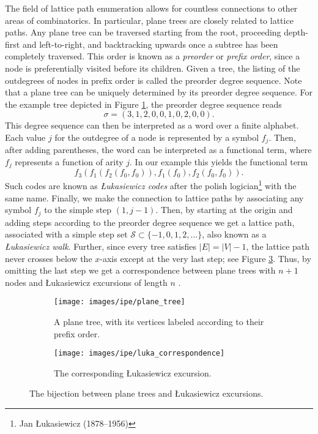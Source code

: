 The field of lattice path enumeration allows for countless connections to other areas of combinatorics. In particular, plane trees are closely related to lattice paths. 
Any plane tree can be traversed starting from the root, proceeding depth-first and left-to-right, and backtracking upwards once a subtree has been completely traversed. 
This order is known as a \textit{preorder} or \textit{prefix order}, since a node is preferentially visited before its children. 
Given a tree, the listing of the outdegrees of nodes in prefix order is called the preorder degree sequence. 
Note that a plane tree can be uniquely determined by its preorder degree sequence. 
For the example tree depicted in Figure \ref{fig:plane_tree}, the preorder degree sequence reads 
$$
  \sigma = (3,1,2,0,0,1,0,2,0,0).
$$
This degree sequence can then be interpreted as a word over a finite alphabet. 
Each value $j$ for the outdegree of a node is represented by a symbol $f_j$. 
Then, after adding parentheses, the word can be interpreted as a functional term, where $f_j$ represents a function of arity $j$. 
In our example this yields the functional term
$$
  f_3(f_1(f_2(f_0,f_0)),f_1(f_0),f_2(f_0,f_0)).
$$
Such codes are known as \textit{Łukasiewicz codes} after the polish logician\footnote{Jan Łukasiewicz (1878--1956)} with the same name.
Finally, we make the connection to lattice paths by associating any symbol $f_j$ to the simple step $(1, j - 1)$. 
Then, by starting at the origin and adding steps according to the preorder degree sequence we get a lattice path, associated with a simple step set $\mathcal{S} \subset \{-1,0,1,2,\dots\}$, also known as a \textit{Łukasiewicz walk}.
Further, since every tree satisfies $|E| = |V| - 1$, the lattice path never crosses below the $x$-axis except at the very last step; see Figure \ref{fig:Łukasiewicz correspondence}. 
Thus, by omitting the last step we get a correspondence between plane trees with $n + 1$ nodes and Łukasiewicz excursions of length $n$ \cite[p.~74--75]{AnalyticCombinatorics}.

\begin{figure}[hbt!]
  \centering
  \begin{subfigure}{0.45 \textwidth}
    \centering
    \texttt{[image: images/ipe/plane\_tree]}
    \caption[Plane tree.]{A plane tree, with its vertices labeled according to their prefix order.}
    \label{fig:plane_tree}
  \end{subfigure}
  \hfill
  \begin{subfigure}{0.45 \textwidth}
    \centering
    \texttt{[image: images/ipe/luka\_correspondence]}
    \caption[Łukasiewicz excursion.]{The corresponding Łukasiewicz excursion.}
    \label{fig:Łukasiewicz correspondence}
  \end{subfigure}
  \caption[Łukasiewicz correspondence.]{The bijection between plane trees and Łukasiewicz excursions.}
\end{figure}

